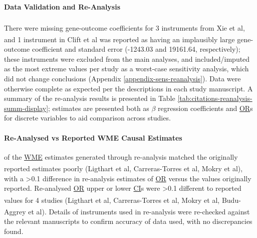 \documentclass[
]{article}
\begin{document}
\paragraph{Data Validation and Re-Analysis}\label{data-validation-and-re-analysis}

\leavevmode\newline There were missing gene-outcome coefficients for 3 instruments from Xie et al\textsuperscript{}, and 1 instrument in Clift et al\textsuperscript{} was reported as having an implausibly large gene-outcome coefficient and standard error (-1243.03 and 19161.64, respectively); these instruments were excluded from the main analyses, and included/imputed as the most extreme values per study as a worst-case sensitivity analysis, which did not change conclusions (Appendix \ref{appendix-sens-reanalysis}). Data were otherwise complete as expected per the descriptions in each study manuscript. A summary of the re-analysis results is presented in Table \ref{tab:citations-reanalysis-summ-display}; estimates are presented both as \(\beta\) regression coefficients and \hyperref[acronyms_OR]{OR}s for discrete variables to aid comparison across studies.

\paragraph{Re-Analysed vs Reported WME Causal Estimates}\label{re-analysed-vs-reported-wme-causal-estimates}

\leavevmode{} of the \hyperref[acronyms_WME]{WME} estimates generated through re-analysis matched the originally reported estimates poorly (Ligthart et al\textsuperscript{}, Carreras-Torres et al\textsuperscript{}, Mokry et al\textsuperscript{}), with a \textgreater0.1 difference in re-analysis estimates of \hyperref[acronyms_OR]{OR} versus the values originally reported. Re-analysed \hyperref[acronyms_OR]{OR} upper or lower \hyperref[acronyms_CI]{CI}s were \textgreater0.1 different to reported values for 4 studies (Ligthart et al\textsuperscript{}, Carreras-Torres et al\textsuperscript{}, Mokry et al\textsuperscript{}, Budu-Aggrey et al\textsuperscript{}). Details of instruments used in re-analysis were re-checked against the relevant manuscripts to confirm accuracy of data used, with no discrepancies found.
\end{document}

